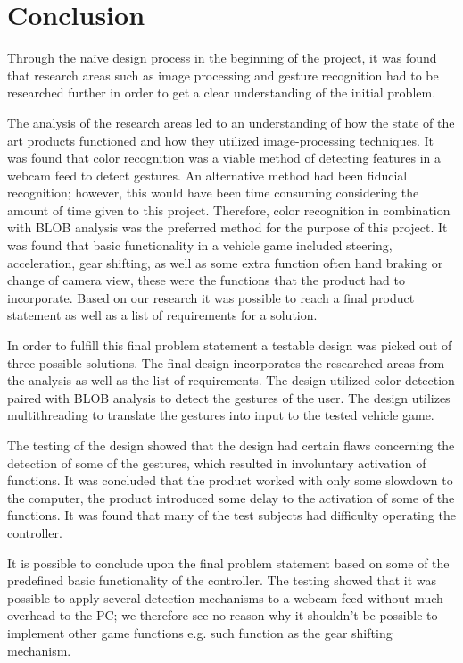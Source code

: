 \section{Conclusion}
Through the naïve design process in the beginning of the project, it was found that research areas such as image processing and gesture recognition had to be researched further in order to get a clear understanding of the initial problem.
\bigskip

The analysis of the research areas led to an understanding of how the state of the art products functioned and how they utilized image-processing techniques. 
It was found that color recognition was a viable method of detecting features in a webcam feed to detect gestures. 
An alternative method had been fiducial recognition; 
however, this would have been time consuming considering the amount of time given to this project. 
Therefore, color recognition in combination with BLOB analysis was the preferred method for the purpose of this project. 
It was found that basic functionality in a vehicle game included steering, acceleration, gear shifting, as well as some extra function often hand braking or change of camera view, these were the functions that the product had to incorporate. 
Based on our research it was possible to reach a final product statement as well as a list of requirements for a solution.
\bigskip

In order to fulfill this final problem statement a testable design was picked out of three possible solutions. 
The final design incorporates the researched areas from the analysis as well as the list of requirements. 
The design utilized color detection paired with BLOB analysis to detect the gestures of the user. 
The design utilizes multithreading to translate the gestures into input to the tested vehicle game.
\bigskip

The testing of the design showed that the design had certain flaws concerning the detection of some of the gestures, which resulted in involuntary activation of functions. 
It was concluded that the product worked with only some slowdown to the computer, the product introduced some delay to the activation of some of the functions. 
It was found that many of the test subjects had difficulty operating the controller.
\bigskip

It is possible to conclude upon the final problem statement based on some of the predefined basic functionality of the controller. The testing showed that it was possible to apply several detection mechanisms to a webcam feed without much overhead to the PC; we therefore see no reason why it shouldn't be possible to implement other game functions e.g. such function as the gear shifting mechanism. 
